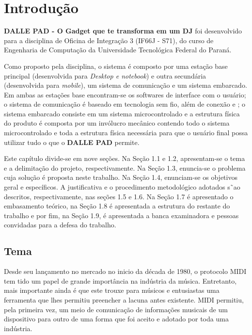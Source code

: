 
\chapter{Introdução}
\label{chap:introducao}

    \textbf{DALLE PAD - O Gadget que te transforma em um DJ} foi desenvolvido para a disciplina de Oficina de Integração 3 (IF66J - S71), do curso de Engenharia de Computação da Universidade Tecnológica Federal do Paraná.
    
    Como proposto pela disciplina, o sistema é composto por uma estação base principal (desenvolvida para \textit{Desktop e notebook}) e outra secundária (desenvolvida para \textit{mobile}), um sistema de comunicação e um sistema embarcado. Em ambas as estações base encontram-se os softwares de interface com o usuário; o sistema de comunicação é baseado em tecnologia sem fio, além de conexão  e ; o sistema embarcado consiste em um sistema microcontrolado e a estrutura física do produto é composta por um invólucro mecânico contendo todo o sistema microcontrolado e toda a estrutura física necessária para que o usuário final possa utilizar tudo o que o \textbf{DALLE PAD} permite.

    Este capítulo divide-se em nove seções. Na Seção 1.1 e 1.2, apresentam-se o tema e a delimitação do projeto, respectivamente. Na Seção 1.3, enuncia-se o problema cuja solução é proposta neste trabalho. Na Seção 1.4, enunciam-se os objetivos geral e específicos. A justificativa e o procedimento metodológico adotados s˜ao descritos, respectivamente, nas seções 1.5 e 1.6. Na Seção 1.7 é apresentado o embasamento teórico, na Seção 1.8 é apresentada a estrutura do restante do trabalho e por fim, na Seção 1.9, é apresentada a banca examinadora e pessoas convidadas para a defesa do trabalho.

    \section{Tema}

        Desde seu lançamento no mercado no inicio da década de 1980, o protocolo MIDI tem tido um papel de grande importância na indústria da música. Entretanto, mais importante ainda é que este trouxe para músicos e entusiastas uma ferramenta que lhes permitiu preencher a lacuna antes existente. MIDI permitiu, pela primeira vez, um meio de comunicação de informações musicais de um dispositivo para outro de uma forma que foi aceito e adotado por toda uma indústria.~\cite{Guerin}
        
